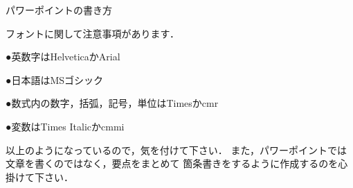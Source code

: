 パワーポイントの書き方 

フォントに関して注意事項があります．

●英数字はHelveticaかArial

●日本語はMSゴシック
    
●数式内の数字，括弧，記号，単位はTimesかcmr
    
●変数はTimes Italicかcmmi

以上のようになっているので，気を付けて下さい．
また，パワーポイントでは文章を書くのではなく，要点をまとめて
箇条書きをするように作成するのを心掛けて下さい．